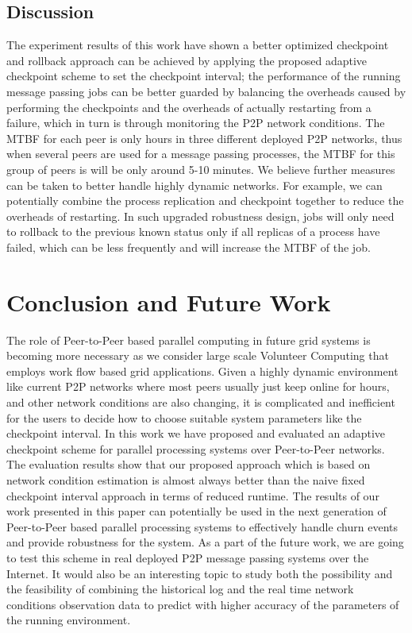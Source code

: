 \documentclass[times, 12pt, onecolumn]{article}
\begin{document}
\subsection{Discussion}
The experiment results of this work have shown a better optimized checkpoint and rollback approach can be achieved by 
applying the proposed adaptive checkpoint scheme to set the checkpoint interval; the performance of the running
message passing jobs can be better guarded by balancing the overheads caused by performing the checkpoints and
the overheads of actually restarting from a failure, which in turn is through monitoring the P2P network conditions.
The MTBF for each peer is only hours in three different 
deployed P2P networks, thus when several peers are used for a message passing processes, the MTBF for this group of peers is 
will be only around 5-10 minutes. We believe further measures can be taken to better handle highly dynamic networks. 
For example, we can potentially combine the process replication and checkpoint together to reduce the overheads of 
restarting. In such upgraded robustness design, jobs will only need to rollback to the previous known status only if all 
replicas of a process have failed, which can be less frequently and will increase the MTBF of the job. 
  
 

\section{Conclusion and Future Work}
The role of Peer-to-Peer based parallel computing in future grid systems is
becoming more necessary as we consider large scale Volunteer Computing that
employs work flow based grid applications.  Given a highly dynamic environment
like current P2P networks where most peers usually just keep online for hours,
and other network conditions are also changing, it is complicated and
inefficient for the users to decide how to choose suitable system parameters
like the checkpoint interval. In this work we have proposed and evaluated an
adaptive checkpoint scheme for parallel processing systems over Peer-to-Peer
networks. The evaluation results show that our proposed approach which is based
on network condition estimation is almost always better than the naive fixed
checkpoint interval approach in terms of reduced runtime. The results of our
work presented in this paper can potentially be used in the next generation of
Peer-to-Peer based parallel processing systems to effectively handle churn
events and provide robustness for the system. As a part of the future work, we
are going to test this scheme in real deployed P2P message passing systems over
the Internet. It would also be an interesting topic to study both the
possibility and the feasibility of combining the historical log and the real
time network conditions observation data to predict with higher accuracy of the
parameters of the running environment. 




\end{document}
